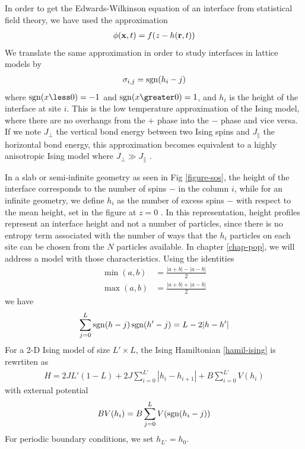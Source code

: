 In order to get the Edwards-Wilkinson equation of an interface from statistical field theory, we have used the approximation 
\begin{align}
\phi({\bf x},t) = f(z-h({\bf r},t))
\end{align}
We translate the same approximation in order to study interfaces in lattice models by
\begin{align}
\sigma_{i,j} = \operatorname{sgn}(h_i-j)
\label{approx-sos}
\end{align}
where $\sgn(x \less 0) = -1$ and $\sgn(x \greater 0) = 1$, and $h_i$ is the height of the interface at site $i$. 
This is the low temperature approximation of the Ising model, where there are no overhangs from the $+$ phase into the $-$ phase and vice versa. If we note $J_\perp$ the vertical bond energy between two Ising spins and $J_\parallel$ the horizontal bond energy, this approximation becomes equivalent to a highly anisotropic Ising model where $J_\perp \gg J_\parallel$ \cite{swendsen_roughening_1977}.

In a slab or semi-infinite geometry as seen in Fig \ref{figure-sos}, the height of the interface corresponds to the number of spins $-$ in the column $i$, while for an infinite geometry, we define $h_i$ as the number of excess spins $-$ with respect to the mean height, set in the figure at $z=0$ \cite{van_leeuwen_pinning_1981}. In this representation, height profiles represent an interface height and not a number of particles, since there is no entropy term associated with the number of ways that the $h_i$ particles on each site can be chosen from the $N$ particles available. In chapter \ref{chap-pop}, we will address a model with those characteristics.
Using the identities
\begin{align}
\min(a,b) &= \frac{|a+b| - |a-b|}{2} \\
\max(a,b) &= \frac{|a+b| + |a-b|}{2}
\end{align}
we have
\begin{align}
\sum_{j=0}^L \operatorname{sgn}(h-j)\operatorname{sgn}(h'-j) = L - 2 |h-h'|
\end{align}
For a 2-D Ising model of size $L'\times L$, the Ising Hamiltonian \eqref{hamil-ising} is rewrtiten as
\begin{align}
H = 2 J L' (1-L) +2 J \sum_{i=0}^{L'} |h_i-h_{i+1}| + B \sum_{i=0}^{L'} V(h_i)
\label{energie-sos-ising}
\end{align}
with external potential 
\begin{align}
B V(h_i) = B \sum_{j=0}^L V(\operatorname{sgn}(h_i-j))
\end{align}
For periodic boundary conditions, we set $h_{L'}=h_0$.

